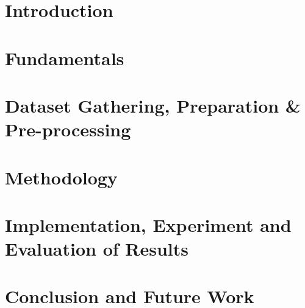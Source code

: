 \documentclass[12pt,a4paper]{report}
\begin{document}






\tableofcontents
\listoffigures
\listoftables
\listoflistings
\newpage
{}

\chapter{Introduction}
\label{chap:1}


\chapter{Fundamentals}
\label{chap:2}


\chapter{Dataset Gathering, Preparation \& Pre-processing}
\label{chap:3}


\chapter{Methodology}
\label{chap:4}


\chapter{Implementation, Experiment and Evaluation of Results}
\label{chap:5}


\chapter{Conclusion and Future Work}
\label{chap:6}


\cleardoublepage
\begin{appendices}
\chapter{}

\end{appendices}


\end{document}
